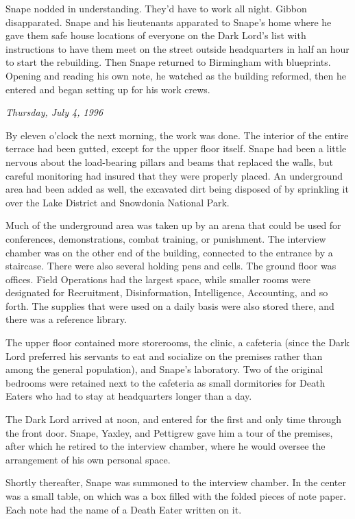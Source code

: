 \documentclass[a4paper,11pt]{article}
\begin{document}
Snape nodded in understanding. They'd have to work all night. Gibbon disapparated. Snape and his lieutenants apparated to Snape's home where he gave them safe house locations of everyone on the Dark Lord's list with instructions to have them meet on the street outside headquarters in half an hour to start the rebuilding. Then Snape returned to Birmingham with blueprints. Opening and reading his own note, he watched as the building reformed, then he entered and began setting up for his work crews.

\emph{Thursday, July 4, 1996}

By eleven o'clock the next morning, the work was done. The interior of the entire terrace had been gutted, except for the upper floor itself. Snape had been a little nervous about the load-bearing pillars and beams that replaced the walls, but careful monitoring had insured that they were properly placed. An underground area had been added as well, the excavated dirt being disposed of by sprinkling it over the Lake District and Snowdonia National Park.

Much of the underground area was taken up by an arena that could be used for conferences, demonstrations, combat training, or punishment. The interview chamber was on the other end of the building, connected to the entrance by a staircase. There were also several holding pens and cells. The ground floor was offices. Field Operations had the largest space, while smaller rooms were designated for Recruitment, Disinformation, Intelligence, Accounting, and so forth. The supplies that were used on a daily basis were also stored there, and there was a reference library.

The upper floor contained more storerooms, the clinic, a cafeteria (since the Dark Lord preferred his servants to eat and socialize on the premises rather than among the general population), and Snape's laboratory. Two of the original bedrooms were retained next to the cafeteria as small dormitories for Death Eaters who had to stay at headquarters longer than a day.

The Dark Lord arrived at noon, and entered for the first and only time through the front door. Snape, Yaxley, and Pettigrew gave him a tour of the premises, after which he retired to the interview chamber, where he would oversee the arrangement of his own personal space.

Shortly thereafter, Snape was summoned to the interview chamber. In the center was a small table, on which was a box filled with the folded pieces of note paper. Each note had the name of a Death Eater written on it.
\end{document}

